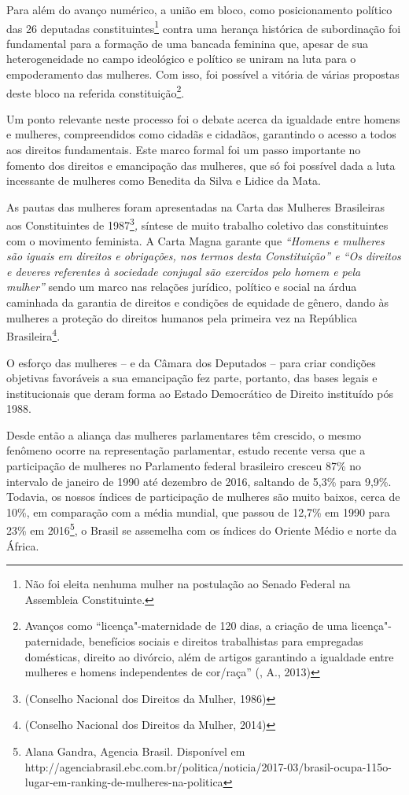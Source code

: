 Para além do avanço numérico, a união em bloco, como posicionamento
político das 26 deputadas constituintes\footnote{Não foi eleita nenhuma
  mulher na postulação ao Senado Federal na Assembleia Constituinte.}
contra uma herança histórica de subordinação foi fundamental para a
formação de uma bancada feminina que, apesar de sua heterogeneidade no
campo ideológico e político se uniram na luta para o empoderamento das
mulheres. Com isso, foi possível a vitória de várias propostas deste
bloco na referida constituição\footnote{Avanços como
  ``licença"-maternidade de 120 dias, a criação de uma
  licença"-paternidade, benefícios sociais e direitos trabalhistas para
  empregadas domésticas, direito ao divórcio, além de artigos garantindo
  a igualdade entre mulheres e homens independentes de cor/raça''
  (, A., 2013)}.

Um ponto relevante neste processo foi o debate acerca da igualdade entre
homens e mulheres, compreendidos como cidadãs e cidadãos, garantindo o
acesso a todos aos direitos fundamentais. Este marco formal foi um passo
importante no fomento dos direitos e emancipação das mulheres, que só
foi possível dada a luta incessante de mulheres como Benedita da Silva e
Lidice da Mata.

As pautas das mulheres foram apresentadas na Carta das Mulheres
Brasileiras aos Constituintes de 1987\footnote{(Conselho Nacional dos
  Direitos da Mulher, 1986)}\emph{,} síntese de muito trabalho coletivo
das constituintes com o movimento feminista. A Carta Magna garante que
\emph{``Homens e mulheres são iguais em direitos e obrigações, nos
termos desta Constituição'' e ``Os direitos e deveres referentes à
sociedade conjugal são exercidos pelo homem e pela mulher''} sendo um
marco nas relações jurídico, político e social na árdua caminhada da
garantia de direitos e condições de equidade de gênero, dando às
mulheres a proteção do direitos humanos pela primeira vez na República
Brasileira\footnote{(Conselho Nacional dos Direitos da Mulher, 2014)}.

O esforço das mulheres -- e da Câmara dos Deputados -- para criar
condições objetivas favoráveis a sua emancipação fez parte, portanto,
das bases legais e institucionais que deram forma ao Estado Democrático
de Direito instituído pós 1988.

Desde então a aliança das mulheres parlamentares têm crescido, o mesmo
fenômeno ocorre na representação parlamentar, estudo recente versa que a
participação de mulheres no Parlamento federal brasileiro cresceu 87\%
no intervalo de janeiro de 1990 até dezembro de 2016, saltando de 5,3\%
para 9,9\%. Todavia, os nossos índices de participação de mulheres são
muito baixos, cerca de 10\%, em comparação com a média mundial, que
passou de 12,7\% em 1990 para 23\% em 2016\footnote{Alana Gandra,
  Agencia Brasil. Disponível em
  http://agenciabrasil.ebc.com.br/politica/noticia/2017-03/brasil-ocupa-115o-lugar-em-ranking-de-mulheres-na-politica},
o Brasil se assemelha com os índices do Oriente Médio e norte da África.

